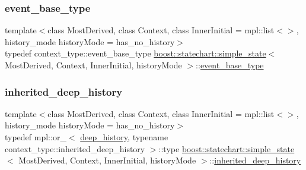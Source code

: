 \subsubsection{\texorpdfstring{event\+\_\+base\+\_\+type}{event\_base\_type}}
{\footnotesize\ttfamily template$<$class Most\+Derived, class Context, class Inner\+Initial = mpl\+::list$<$$>$, history\+\_\+mode history\+Mode = has\+\_\+no\+\_\+history$>$ \\
typedef context\+\_\+type\+::event\+\_\+base\+\_\+type \mbox{\hyperlink{classboost_1_1statechart_1_1simple__state}{boost\+::statechart\+::simple\+\_\+state}}$<$ Most\+Derived, Context, Inner\+Initial, history\+Mode $>$\+::\mbox{\hyperlink{classboost_1_1statechart_1_1simple__state_a153e115715f5d828021a273ce282ba9b}{event\+\_\+base\+\_\+type}}}

\mbox{\label{classboost_1_1statechart_1_1simple__state_a0a3f8d8bb00bdd1769113111b2e2fae7}} 
\subsubsection{\texorpdfstring{inherited\+\_\+deep\+\_\+history}{inherited\_deep\_history}}
{\footnotesize\ttfamily template$<$class Most\+Derived, class Context, class Inner\+Initial = mpl\+::list$<$$>$, history\+\_\+mode history\+Mode = has\+\_\+no\+\_\+history$>$ \\
typedef mpl\+::or\+\_\+$<$ \mbox{\hyperlink{classboost_1_1statechart_1_1simple__state_a2e6aa9f4912c70a9dbef800845044bc7}{deep\+\_\+history}}, typename context\+\_\+type\+::inherited\+\_\+deep\+\_\+history $>$\+::type \mbox{\hyperlink{classboost_1_1statechart_1_1simple__state}{boost\+::statechart\+::simple\+\_\+state}}$<$ Most\+Derived, Context, Inner\+Initial, history\+Mode $>$\+::\mbox{\hyperlink{classboost_1_1statechart_1_1simple__state_a0a3f8d8bb00bdd1769113111b2e2fae7}{inherited\+\_\+deep\+\_\+history}}}

\mbox{\label{classboost_1_1statechart_1_1simple__state_ad6d3233a11a23e91b4cc9edcae799379}} 
